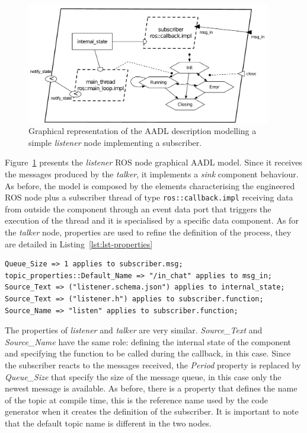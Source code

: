 \begin{figure}[t]
\centering
\includegraphics[width=0.95\textwidth]{gfx/usecase-subscriber}
\caption{Graphical representation of the AADL description modelling a simple \textit{listener} node implementing a subscriber.}\label{fig:usecase-subscriber}
\end{figure}

Figure~\ref{fig:usecase-subscriber} presents the \textit{listener} ROS node graphical AADL model. Since it receives the messages produced by the \textit{talker}, it implements a \textit{sink} component behaviour. As before, the model is composed by the elements characterising the engineered ROS node plus a subscriber thread of type \texttt{ros::callback.impl} receiving data from outside the component through an event data port that triggers the execution of the thread and it is specialised by a specific data component. As for the \textit{talker} node, properties are used to refine the definition of the process, they are detailed in Listing~\ref{lst:lst-properties}

\begin{lstlisting}[language=AADL,caption={Properties of the listener node.},label=lst:lst-properties]
Queue_Size => 1 applies to subscriber.msg;
topic_properties::Default_Name => "/in_chat" applies to msg_in;
Source_Text => ("listener.schema.json") applies to internal_state;
Source_Text => ("listener.h") applies to subscriber.function;
Source_Name => "listen" applies to subscriber.function;
\end{lstlisting}

The properties of \textit{listener} and \textit{talker} are very similar. \textit{Source\_Text} and \textit{Source\_Name} have the same role: defining the internal state of the component and specifying the function to be called during the callback, in this case. Since the subscriber reacts to the messages received, the \textit{Period} property is replaced by \textit{Queue\_Size} that specify the size of the message queue, in this case only the newest message is available. As before, there is a property that defines the name of the topic at compile time, this is the reference name used by the code generator when it creates the definition of the subscriber. It is important to note that the default topic name is different in the two nodes.

